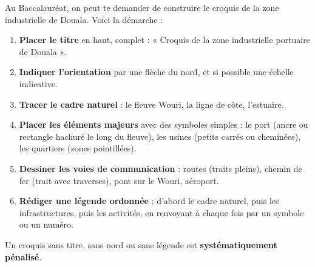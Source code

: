 \documentclass[11pt]{article}
\begin{document}
\begin{methode}
Au Baccalauréat, on peut te demander de construire le croquis de la zone industrielle de Douala. Voici la démarche :
\begin{enumerate}
\item \textbf{Placer le titre} en haut, complet : « Croquis de la zone industrielle portuaire de Douala ».
\item \textbf{Indiquer l'orientation} par une flèche du nord, et si possible une échelle indicative.
\item \textbf{Tracer le cadre naturel} : le fleuve Wouri, la ligne de côte, l'estuaire.
\item \textbf{Placer les éléments majeurs} avec des symboles simples : le port (ancre ou rectangle hachuré le long du fleuve), les usines (petits carrés ou cheminées), les quartiers (zones pointillées).
\item \textbf{Dessiner les voies de communication} : routes (traits pleins), chemin de fer (trait avec traverses), pont sur le Wouri, aéroport.
\item \textbf{Rédiger une légende ordonnée} : d'abord le cadre naturel, puis les infrastructures, puis les activités, en renvoyant à chaque fois par un symbole ou un numéro.
\end{enumerate}
Un croquis sans titre, sans nord ou sans légende est \textbf{systématiquement pénalisé}.
\end{methode}
\end{document}
